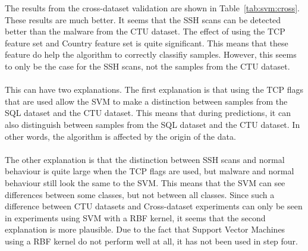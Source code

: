 \noindent The results from the cross-dataset validation are shown in Table~\ref{tab:svm:cross}. These results are much better. It seems that the SSH scans can
be detected better than the malware from the CTU dataset. The effect of using the TCP feature set and Country feature set is quite significant. This means that these feature do help the algorithm to correctly classifiy samples. However, this seems to only be the case for the SSH scans, not the samples from the CTU dataset. \\
\\
This can have two explanations. The first explanation is that using the TCP flags that are used allow the SVM to make a distinction between samples from the SQL dataset and the CTU dataset. This means that during predictions, it can also distinguish between samples from the SQL dataset and the CTU dataset. In other words, the algorithm is affected by the origin of the data. \\
\\
The other explanation is that the distinction between SSH scans and normal behaviour is quite large when the TCP flags are used, but malware and normal behaviour still look the same to the SVM.  This means that the SVM can see differences between some classes, but not between all classes. Since such a difference between CTU datasets and Cross-dataset experiments can only be seen in experiments using SVM with a RBF kernel, it seems that the second explanation is more plausible. Due to the fact that Support Vector Machines using a RBF kernel do not perform well at all, it has not been used in step four.

